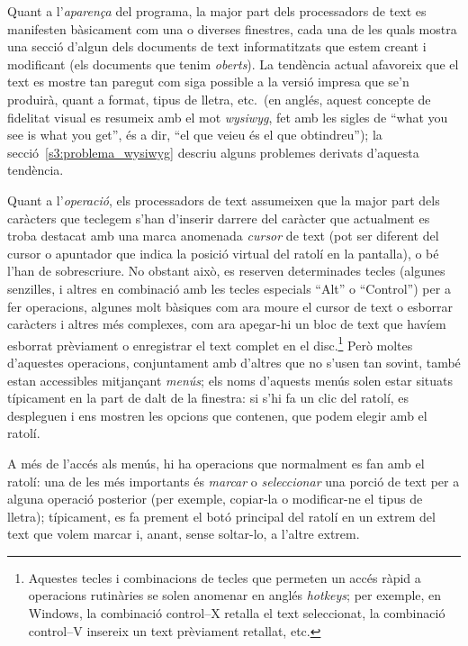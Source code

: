 Quant a l'\emph{aparença} del programa, la major part dels
processadors de text es manifesten bàsicament com una o diverses
finestres, cada una de les quals mostra una secció d'algun dels
documents de text informatitzats que estem creant i modificant (els
documents que tenim \emph{oberts}).  La tendència actual afavoreix que
el text es mostre tan paregut com siga possible a la versió impresa
que se'n produirà, quant a format, tipus de lletra, etc.\ (en anglés,
aquest concepte de fidelitat visual es resumeix amb el mot {\em
  wysiwyg}, fet amb les sigles de ``what you see is what you get'', és
a dir, ``el que veieu és el que obtindreu''); la
secció~\ref{s3:problema_wysiwyg} descriu alguns problemes derivats
d'aquesta tendència.

Quant a l'\emph{operació}, els processadors de text assumeixen que la major
part dels caràcters que teclegem s'han d'inserir darrere del caràcter
que actualment es troba destacat amb una marca anomenada {\em
  cursor} de text (pot ser diferent del cursor o apuntador que indica
la posició virtual del ratolí en la pantalla), o bé l'han de
sobrescriure. No obstant això, es reserven determinades tecles
(algunes senzilles, i altres en combinació amb les tecles especials
``Alt'' o ``Control'') per a fer operacions, algunes molt bàsiques com ara
moure el cursor de text o esborrar caràcters i altres més complexes,
com ara apegar-hi un bloc de text que havíem esborrat prèviament o
enregistrar el text complet en el disc.\footnote{Aquestes tecles i combinacions
de tecles que permeten un accés ràpid a operacions rutinàries se solen
anomenar en anglés \emph{hotkeys}; per exemple, en Windows, la
combinació control--X retalla el text seleccionat, la combinació
control--V insereix un text prèviament retallat, etc.} Però moltes d'aquestes
operacions, conjuntament amb d'altres que no s'usen tan sovint, també
estan accessibles mitjançant \emph{menús}; els noms d'aquests menús
solen estar situats típicament en la part de dalt de la finestra: si
s'hi fa un clic del ratolí, es despleguen i ens mostren les opcions
que contenen, que podem elegir amb el ratolí.

A més de l'accés als menús, hi ha operacions que normalment es fan amb
el ratolí: una de les més importants és \emph{marcar} o
\emph{seleccionar} una porció de text per a alguna operació posterior
(per exemple, copiar-la o modificar-ne el tipus de lletra);
típicament, es fa prement el botó principal del ratolí en un extrem
del text que volem marcar i, anant, sense soltar-lo, a l'altre extrem.

